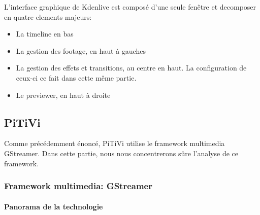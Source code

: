 L'interface graphique de Kdenlive est composé d'une seule fenêtre et
decomposer en quatre elements majeurs:

\begin{itemize}

  \item {La timeline en bas}

  \item {La gestion des footage, en haut à gauches}

  \item {La gestion des effets et transitions, au centre en haut. La
  configuration de ceux-ci ce fait dans cette même partie.}

  \item {Le previewer, en haut à droite}

\end{itemize}

\subsection {PiTiVi}

Comme précédemment énoncé, PiTiVi utilise le framework multimedia
GStreamer. Dans cette partie, nous nous concentrerons sûre l'analyse
de ce framework.

\subsubsection {Framework multimedia: GStreamer}

\paragraph {Panorama de la technologie} %

\subparagraph{}

